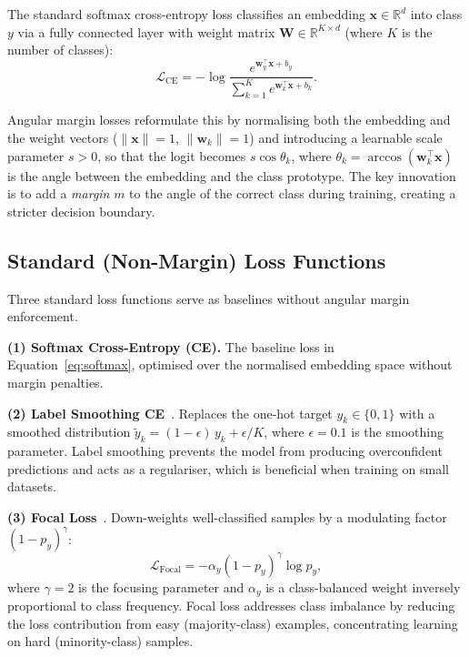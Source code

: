 The standard softmax cross-entropy loss classifies an embedding $\mathbf{x} \in \mathbb{R}^d$ into class $y$ via a fully connected layer with weight matrix $\mathbf{W} \in \mathbb{R}^{K \times d}$ (where $K$ is the number of classes):
\begin{equation}
\label{eq:softmax}
\mathcal{L}_{\text{CE}} = -\log \frac{e^{\mathbf{w}_y^\top \mathbf{x} + b_y}}{\sum_{k=1}^{K} e^{\mathbf{w}_k^\top \mathbf{x} + b_k}}.
\end{equation}

Angular margin losses reformulate this by normalising both the embedding and the weight vectors ($\|\mathbf{x}\| = 1$, $\|\mathbf{w}_k\| = 1$) and introducing a learnable scale parameter $s > 0$, so that the logit becomes $s \cos\theta_{k}$, where $\theta_k = \arccos(\mathbf{w}_k^\top \mathbf{x})$ is the angle between the embedding and the class prototype.
The key innovation is to add a \emph{margin} $m$ to the angle of the correct class during training, creating a stricter decision boundary.


\subsection{Standard (Non-Margin) Loss Functions}
\label{sec:bg:standard_losses}

Three standard loss functions serve as baselines without angular margin enforcement.

\textbf{(1) Softmax Cross-Entropy (CE).}
The baseline loss in Equation~\ref{eq:softmax}, optimised over the normalised embedding space without margin penalties.

\textbf{(2) Label Smoothing CE}~\cite{szegedy2016rethinking}.
Replaces the one-hot target $y_k \in \{0,1\}$ with a smoothed distribution $\tilde{y}_k = (1 - \epsilon)\,y_k + \epsilon / K$, where $\epsilon = 0.1$ is the smoothing parameter.
Label smoothing prevents the model from producing overconfident predictions and acts as a regulariser, which is beneficial when training on small datasets.

\textbf{(3) Focal Loss}~\cite{lin2017focal}.
Down-weights well-classified samples by a modulating factor $(1 - p_y)^\gamma$:
\begin{equation}
\label{eq:focal}
\mathcal{L}_{\text{Focal}} = -\alpha_y (1 - p_y)^\gamma \log p_y,
\end{equation}
where $\gamma = 2$ is the focusing parameter and $\alpha_y$ is a class-balanced weight inversely proportional to class frequency.
Focal loss addresses class imbalance by reducing the loss contribution from easy (majority-class) examples, concentrating learning on hard (minority-class) samples.


